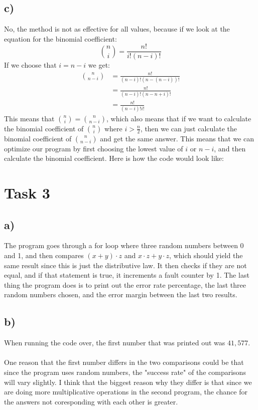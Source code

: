 \documentclass{article}
\begin{document}
\subsection*{c)}
No, the method is not as effective for all values, because if we look at the equation for the binomial coefficient:
\begin{equation}
    {n \choose i} = \frac{n!}{i!(n-i)!}
\end{equation}
If we choose that $i = n-i$ we get:
\begin{equation}
    \begin{split}
        {n \choose n-i} &= \frac{n!}{(n-i)!(n-(n-i))!} \\
                        &= \frac{n!}{(n-i)!(n-n+i)!} \\
                        &= \frac{n!}{(n-i)!i!}
    \end{split}
\end{equation}
This means that ${n \choose i} = {n \choose n-i}$, which also means that if we want to calculate the binomial coefficient
of ${n \choose i}$ where $i > \frac{n}{2}$, then we can just calculate the binomial coefficient of ${n \choose n-i}$ and get the same answer.
This means that we can optimize our program by first choosing the lowest value of $i$ or $n-i$, and then calculate the binomial coefficient. Here is how the code would look like:



\newpage

\section*{Task 3}
\subsection*{a)}
The program goes through a for loop where three random numbers between 0 and 1, and then compares $(x + y) \cdot z$ and $x \cdot z + y \cdot z$, which should yield
the same result since this is just the distributive law. It then checks if they are not equal, and if that statement is true, it increments a fault counter by 1.
The last thing the program does is to print out the error rate percentage, the last three random numbers chosen, and the error margin between the last two results.

\subsection*{b)}

When running the code over, the first number that was printed out was $41,577$. \\\\
One reason that the first number differs in the two comparisons could be that since the program uses random numbers, the "success rate" of the comparisons will vary slightly.
I think that the biggest reason why they differ is that since we are doing more multiplicative operations in the second program, the chance for the answers not coresponding
with each other is greater.
\end{document}
